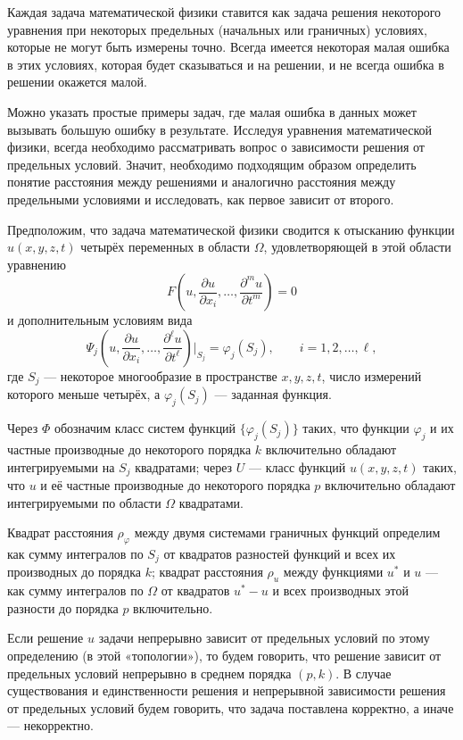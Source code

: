 \begin{rusblock}
Каждая задача математической физики ставится как задача решения некоторого уравнения при некоторых предельных (начальных или граничных) условиях, которые не могут быть измерены точно. Всегда имеется некоторая малая ошибка в этих условиях, которая будет сказываться и на решении, и не всегда ошибка в решении окажется малой.

Можно указать простые примеры задач, где малая ошибка в данных может вызывать большую ошибку в результате. Исследуя уравнения математической физики, всегда необходимо рассматривать вопрос о зависимости решения от предельных условий. Значит, необходимо подходящим образом определить понятие расстояния между решениями и аналогично расстояния между предельными условиями и исследовать, как первое зависит от второго.

Предположим, что задача математической физики сводится к отысканию функции $u(x,y,z,t)$ четырёх переменных в области $\Omega$, удовлетворяющей в этой области уравнению
\[
F\!\left(u,\frac{\partial u}{\partial x_i},\ldots,
\frac{\partial^m u}{\partial t^m}\right)=0
\]
и дополнительным условиям вида
\[
\Psi_j\!\left(u,\frac{\partial u}{\partial x_i},\ldots,
\frac{\partial^{\ell}u}{\partial t^{\ell}}\right)\Big|_{S_j}=\varphi_j(S_j),
\qquad i=1,2,\ldots,\ell,
\]
где $S_j$ --- некоторое многообразие в пространстве $x,y,z,t$, число измерений которого меньше четырёх, а $\varphi_j(S_j)$ --- заданная функция.

Через $\Phi$ обозначим класс систем функций $\{\varphi_j(S_j)\}$ таких, что функции $\varphi_j$ и их частные производные до некоторого порядка $k$ включительно обладают интегрируемыми на $S_j$ квадратами; через $U$ --- класс функций $u(x,y,z,t)$ таких, что $u$ и её частные производные до некоторого порядка $p$ включительно обладают интегрируемыми по области $\Omega$ квадратами.

Квадрат расстояния $\rho_{\varphi}$ между двумя системами граничных функций определим как сумму интегралов по $S_j$ от квадратов разностей функций и всех их производных до порядка $k$; квадрат расстояния $\rho_u$ между функциями $u^*$ и $u$ --- как сумму интегралов по $\Omega$ от квадратов $u^*-u$ и всех производных этой разности до порядка $p$ включительно.

Если решение $u$ задачи непрерывно зависит от предельных условий по этому определению (в этой «топологии»), то будем говорить, что решение зависит от предельных условий непрерывно в среднем порядка $(p,k)$. В случае существования и единственности решения и непрерывной зависимости решения от предельных условий будем говорить, что задача поставлена корректно, а иначе --- некорректно.
\end{rusblock}

